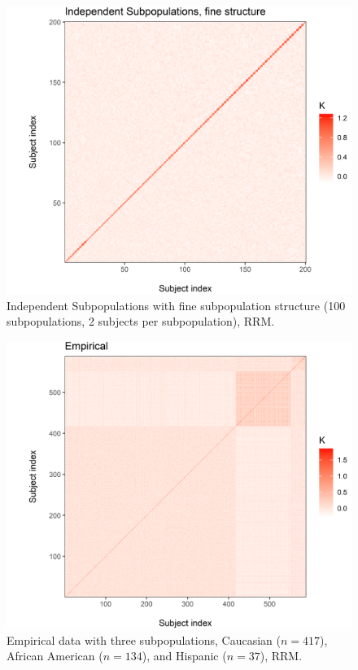 \begin{figure}[H]
    \centering
    \includegraphics[scale = 1]{figures/figure_09.png}
    \caption{Independent Subpopulations with fine subpopulation structure (100 subpopulations, 2 subjects per subpopulation), RRM.}
    \label{fig:indep_fine}
\end{figure}

\begin{figure}[H]
    \centering
    \includegraphics[scale = 1]{figures/figure_10.png}
    \caption{Empirical data with three subpopulations, Caucasian ($n = 417$), African American ($n = 134$), and Hispanic ($n = 37$), RRM.}
    \label{fig:empirical}
\end{figure}

